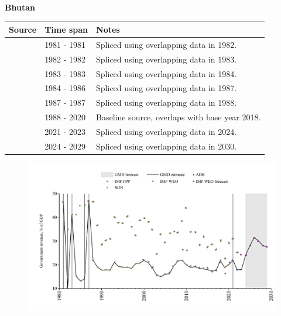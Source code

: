 \documentclass[12pt,a4paper,landscape]{article}
\begin{document}
\begin{adjustbox}{max totalsize={\paperwidth}{\paperheight},center}
\begin{minipage}[t][\textheight][t]{\textwidth}
\vspace*{0.5cm}
{}
\begin{center}
{\Large\bfseries Bhutan}
\end{center}
\vspace{0.5cm}
\begin{table}[H]
\centering
\small
\begin{tabular}{|l|l|l|}
\hline
\textbf{Source} & \textbf{Time span} & \textbf{Notes} \\
\hline
\rowcolor{white}\cite{IMF_WEO}& 1981 - 1981 &Spliced using overlapping data in 1982.\\
\rowcolor{lightgray}\cite{WDI}& 1982 - 1982 &Spliced using overlapping data in 1983.\\
\rowcolor{white}\cite{IMF_WEO}& 1983 - 1983 &Spliced using overlapping data in 1984.\\
\rowcolor{lightgray}\cite{WDI}& 1984 - 1986 &Spliced using overlapping data in 1987.\\
\rowcolor{white}\cite{IMF_WEO}& 1987 - 1987 &Spliced using overlapping data in 1988.\\
\rowcolor{lightgray}\cite{WDI}& 1988 - 2020 &Baseline source, overlaps with base year 2018.\\
\rowcolor{white}\cite{ADB}& 2021 - 2023 &Spliced using overlapping data in 2024.\\
\rowcolor{lightgray}\cite{IMF_WEO_forecast}& 2024 - 2029 &Spliced using overlapping data in 2030.\\
\hline
\end{tabular}
\end{table}
\begin{figure}[H]
\centering
\includegraphics[width=\textwidth,height=0.6\textheight,keepaspectratio]{graphs/BTN_govrev_GDP.pdf}
\end{figure}
\end{minipage}
\end{adjustbox}
\end{document}
